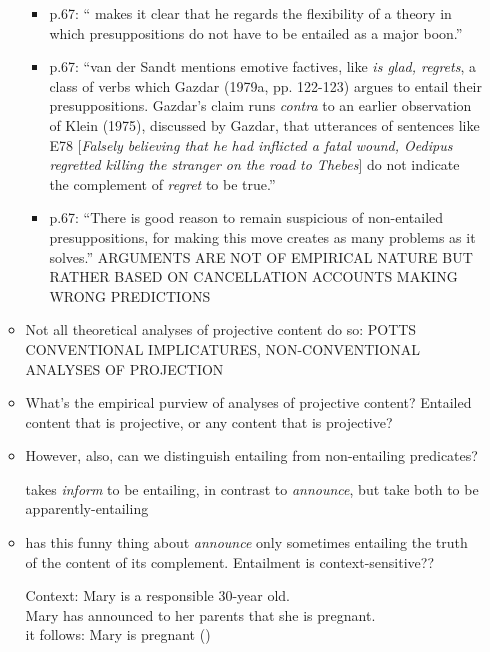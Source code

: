 \documentclass[11pt,fleqn]{article}
\newcommand{\6}{\mbox{$[\hspace*{-.6mm}[$}}
\newcommand{\9}{\mbox{$]\hspace*{-.6mm}]$}}
\begin{document}
\begin{itemize}
\begin{itemize}
\begin{itemize}
\item p.67: ``\citealt[196-198]{vds88} makes it clear that he regards the flexibility of a theory in which presuppositions do not have to be entailed as a major boon.''

\item p.67: ``van der Sandt mentions emotive factives, like {\em is glad, regrets}, a class of verbs which Gazdar (1979a, pp. 122-123) argues to entail their presuppositions. Gazdar's claim runs {\em contra} to an earlier observation of Klein (1975), discussed by Gazdar, that utterances of sentences like E78 [{\em Falsely believing that he had inflicted a fatal wound, Oedipus regretted killing the stranger on the road to Thebes}] do not indicate the complement of {\em regret} to be true.''

\item p.67: ``There is good reason to remain suspicious of non-entailed presuppositions, for making this move creates as many problems as it solves.'' ARGUMENTS ARE NOT OF EMPIRICAL NATURE BUT RATHER BASED ON CANCELLATION ACCOUNTS MAKING WRONG PREDICTIONS

\end{itemize}

\item Not all theoretical analyses of projective content do so: POTTS CONVENTIONAL IMPLICATURES, NON-CONVENTIONAL ANALYSES OF PROJECTION

\item What's the empirical purview of analyses of projective content? Entailed content that is projective, or any content that is projective?

\item However, also, can we distinguish entailing from non-entailing predicates? 

\citealt{schlenker10} takes {\em inform} to be entailing, in contrast to {\em announce}, but \citealt{anand-hacquard2014} take both to be apparently-entailing

\item \citealt{schlenker10} has this funny thing about {\em announce} only sometimes entailing the truth of the content of its complement. Entailment is context-sensitive??

\begin{exe}
\ex 
\begin{xlist}
\ex Context: Mary is a responsible 30-year old. 
\\ Mary has announced to her parents that she is pregnant. 
\\ it follows: Mary is pregnant \hfill (\citealt[139]{schlenker10})


\end{xlist}
\end{exe}
\end{itemize}
\end{itemize}
\end{document}
